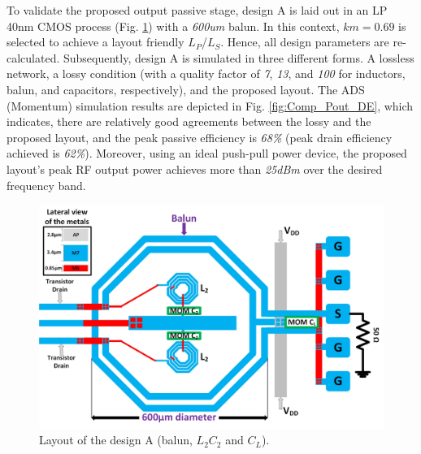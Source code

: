 \documentclass[conference]{IEEEtran}
\begin{document}
To validate the proposed output passive stage,  design A is laid out in an LP 40nm CMOS process (Fig. \ref{fig:ON_X1}) with a \textit{600um} balun. In this context, $km=0.69$ is selected to achieve a layout friendly $L_P$/$L_S$. Hence, all design parameters are re-calculated. Subsequently, design A is simulated in three different forms. A lossless network, a lossy condition (with a quality factor of \textit{7},  \textit{13}, and \textit{100} for inductors, balun, and capacitors, respectively), and the proposed layout. The ADS (Momentum) simulation results are depicted in Fig. \ref{fig:Comp_Pout_DE}, which indicates, there are relatively good agreements between the lossy and the proposed layout, and the peak passive efficiency is \textit{68\%} (peak drain efficiency achieved is \textit{62\%}). Moreover, using an ideal push-pull power device, the proposed layout's peak RF output power achieves more than \textit{25dBm} over the desired frequency band. 

\begin{figure}[!t]
\centering
\captionsetup{font=footnotesize}
\includegraphics[width=1\linewidth]{Images/Output_Network_Comp/Balun_V1.jpg}
\caption{Layout of the design A (balun, $L_2C_2$ and $C_L$).}
\label{fig:ON_X1}
\vspace{-0.1in}
\end{figure}
\end{document}
